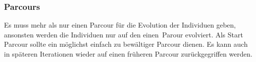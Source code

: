     \subsubsection{Parcours}
      Es muss mehr als nur einen Parcour für die Evolution der Individuen geben,
      ansonsten werden die Individuen nur auf den einen Parour evolviert.
      Als Start Parcour sollte ein möglichst einfach zu bewältiger Parcour dienen.
      Es kann auch in späteren Iterationen wieder auf einen früheren Parcour zurückgegriffen werden.
